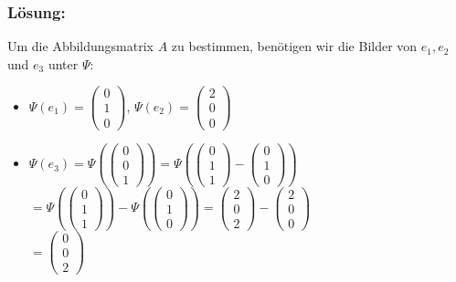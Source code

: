 %
\begin{frame}\frametitle{Lösung:}
%
Um die Abbildungsmatrix $A$ zu bestimmen, benötigen wir die Bilder von $e_1,e_2$ und $e_3$ unter $\Psi$:

\begin{itemize}

\item $\Psi(e_1)=\begin{pmatrix} 0 \\ 1 \\ 0\end{pmatrix}$, $\Psi(e_2)= \begin{pmatrix}2\\0\\0\end{pmatrix}$

\item $\Psi(e_3)=\Psi(\begin{pmatrix} 0 \\ 0\\1\end{pmatrix})=\Psi(\begin{pmatrix}0\\1\\1 \end{pmatrix}-\begin{pmatrix} 0\\1\\0\end{pmatrix})$\\\hspace{10,5mm}$=\Psi(\begin{pmatrix}0\\1\\1 \end{pmatrix})-\Psi(\begin{pmatrix} 0\\1\\0\end{pmatrix})= \begin{pmatrix} 2 \\ 0 \\ 2\end{pmatrix}- \begin{pmatrix}2\\0\\0\end{pmatrix}$\\\hspace{10,5mm}$= \begin{pmatrix}0\\0\\2\end{pmatrix}$
\end{itemize}

\end{frame}
